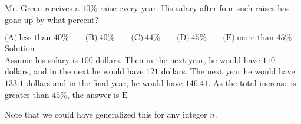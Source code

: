 

Mr. Green receives a $10\%$ raise every year. His salary after four such raises has gone up by what percent?

$\text{(A)}\ \text{less than }40\% \qquad \text{(B)}\ 40\% \qquad \text{(C)}\ 44\% \qquad \text{(D)}\ 45\% \qquad \text{(E)}\ \text{more than }45\%$
\\
Solution
\\
Assume his salary is $100$ dollars. Then in the next year, he would have $110$ dollars, and in the next he would have $121$ dollars. The next year he would have $133.1$ dollars and in the final year, he would have $146.41$. As the total increase is greater than $45\%$, the answer is $\boxed{\text{E}}$

Note that we could have generalized this for any integer $n$.

